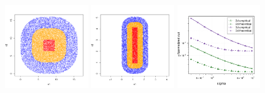\documentclass{article}
\newcommand{\1}{\mathbf{1}}
\theoremstyle{aldenthm}
\theoremstyle{aldenrmrk}
\begin{document}
\begin{figure}[tb]
  \centering
  \includegraphics[width=0.32\textwidth]{example1plots/sample2}
  \includegraphics[width=0.32\textwidth]{example1plots/sample1}
  \includegraphics[width=0.32\textwidth]{example1plots/sigma_normalized_cut_plot}
  

\end{figure}
\end{document}
